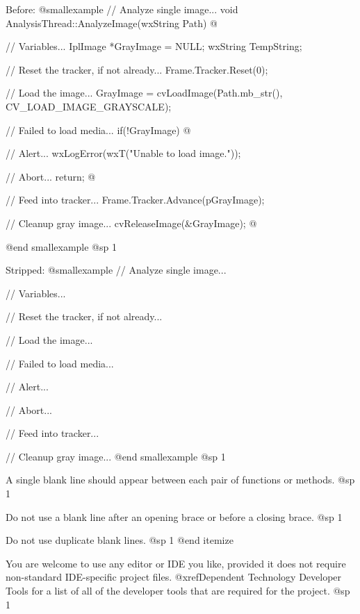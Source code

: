 Before:
@smallexample
// Analyze single image...
void AnalysisThread::AnalyzeImage(wxString Path)
@{
    // Variables...
    IplImage   *GrayImage   = NULL;
    wxString    TempString;

    // Reset the tracker, if not already...
    Frame.Tracker.Reset(0);

    // Load the image...
    GrayImage = cvLoadImage(Path.mb_str(), CV_LOAD_IMAGE_GRAYSCALE);

        // Failed to load media...
        if(!GrayImage)
        @{
            // Alert...
            wxLogError(wxT("Unable to load image."));
            
            // Abort...
            return;
        @}

    // Feed into tracker...
    Frame.Tracker.Advance(pGrayImage);
    
    // Cleanup gray image...
    cvReleaseImage(&GrayImage);
@}
@end smallexample
@sp 1

Stripped:
@smallexample
// Analyze single image...

    // Variables...

    // Reset the tracker, if not already...

    // Load the image...

        // Failed to load media...

            // Alert...

            // Abort...

    // Feed into tracker...
    
    // Cleanup gray image...
@end smallexample
@sp 1

\item
A single blank line should appear between each pair of functions or methods. 
@sp 1

\item
Do not use a blank line after an opening brace or before a closing brace.
@sp 1

\item
Do not use duplicate blank lines.
@sp 1
@end itemize

You are welcome to use any editor or IDE you like, provided it does not require non-standard IDE-specific project files. @xref{Dependent Technology Developer Tools} for a list of all of the developer tools that are required for the project.
@sp 1

